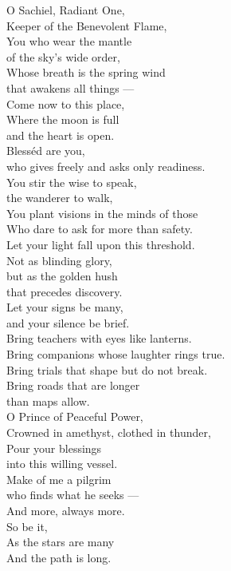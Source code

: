 \documentclass[10pt,openany]{book}
\newcommand{\prayersize}{\Large}
\newcommand{\prayerblock}[1]{%
  {\linespread{1.2}\prayersize\noindent #1\par}%
}
\begin{document}
\prayerblock{%
  O Sachiel, Radiant One,\\
  Keeper of the Benevolent Flame,\\
  You who wear the mantle\\
  of the sky's wide order,\\
  Whose breath is the spring wind\\
  that awakens all things ---\\
  Come now to this place,\\
  Where the moon is full\\
  and the heart is open.\\[8pt]
  Bless\'ed are you,\\
  who gives freely and asks only readiness.\\
  You stir the wise to speak,\\
  the wanderer to walk,\\
  You plant visions in the minds of those\\
  Who dare to ask for more than safety.\\[8pt]
  Let your light fall upon this threshold.\\
  Not as blinding glory,\\
  but as the golden hush\\
  that precedes discovery.\\
  Let your signs be many,\\
  and your silence be brief.\\[8pt]
  Bring teachers with eyes like lanterns.\\
  Bring companions whose laughter rings true.\\
  Bring trials that shape but do not break.\\
  Bring roads that are longer\\
  than maps allow.\\[8pt]
  O Prince of Peaceful Power,\\
  Crowned in amethyst, clothed in thunder,\\
  Pour your blessings\\
  into this willing vessel.\\
  Make of me a pilgrim\\
  who finds what he seeks ---\\
  And more, always more.\\[8pt]
  So be it,\\
  As the stars are many\\
  And the path is long.
}
\end{document}
